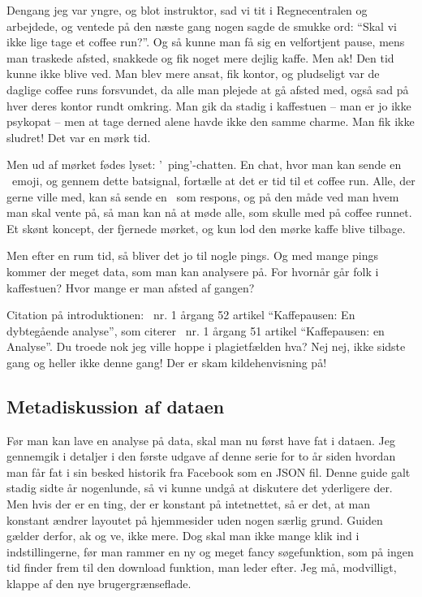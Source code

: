 \begin{article}
Dengang jeg var yngre, og blot instruktor, sad vi tit i Regnecentralen og arbejdede, og ventede på den næste gang nogen sagde de smukke ord: ``Skal vi ikke lige tage et coffee run?''. Og så kunne man få sig en velfortjent pause, mens man traskede afsted, snakkede og fik noget mere dejlig kaffe. Men ak! Den tid kunne ikke blive ved. Man blev mere ansat, fik kontor, og pludseligt var de daglige coffee runs forsvundet, da alle man plejede at gå afsted med, også sad på hver deres kontor rundt omkring. Man gik da stadig i kaffestuen -- man er jo ikke psykopat -- men at tage derned alene havde ikke den samme charme. Man fik ikke sludret! Det var en mørk tid.

Men ud af mørket fødes lyset: '\coffee\ ping'-chatten.
En chat, hvor man kan sende en \coffee\ emoji, og gennem dette batsignal, fortælle at det er tid til et coffee run. Alle, der gerne ville med, kan så sende en \coffee\ som respons, og på den måde ved man hvem man skal vente på, så man kan nå at møde alle, som skulle med på coffee runnet. Et skønt koncept, der fjernede mørket, og kun lod den mørke kaffe blive tilbage.

Men efter en rum tid, så bliver det jo til nogle pings. Og med mange pings kommer der meget data, som man kan analysere på. For hvornår går folk i kaffestuen? Hvor mange er man afsted af gangen?

Citation på introduktionen: \madsfoek\ nr. 1 årgang 52 artikel ``Kaffepausen: En dybtegående analyse'', som citerer \madsfoek\ nr. 1 årgang 51 artikel ``Kaffepausen: en Analyse''.
Du troede nok jeg ville hoppe i plagietfælden hva? Nej nej, ikke sidste gang og heller ikke denne gang! Der er skam kildehenvisning på!


\subsection*{Metadiskussion af dataen}

Før man kan lave en analyse på data, skal man nu først have fat i dataen.
Jeg gennemgik i detaljer i den første udgave af denne serie for to år siden hvordan man får fat i sin besked historik fra Facebook som en JSON fil. Denne guide galt stadig sidte år nogenlunde, så vi kunne undgå at diskutere det yderligere der. Men hvis der er en ting, der er konstant på intetnettet, så er det, at man konstant ændrer layoutet på hjemmesider uden nogen særlig grund. Guiden gælder derfor, ak og ve, ikke mere. Dog skal man ikke mange klik ind i indstillingerne, før man rammer en ny og meget fancy søgefunktion, som på ingen tid finder frem til den download funktion, man leder efter. Jeg må, modvilligt, klappe af den nye brugergrænseflade.


\end{article}
